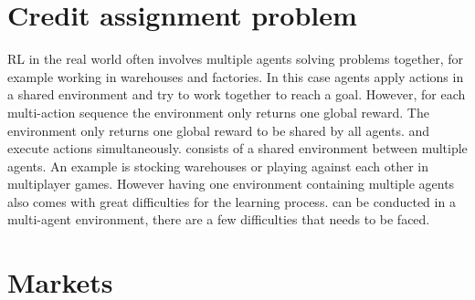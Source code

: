 \section{Credit assignment problem}

RL in the real world often involves multiple agents solving problems together, for
example working in warehouses and factories. In this case agents apply actions in a shared
environment and try to work together to reach a goal. However, for each multi-action sequence
the environment only returns one global reward.   The environment only returns one
global reward to be shared by all agents.
and execute actions
simultaneously.  consists of a shared environment between multiple agents. An example
is
stocking warehouses or playing against each other in multiplayer games. However
having one environment containing multiple agents also comes with great difficulties for
the learning process.     can be conducted in a multi-agent environment, there are a few difficulties
that needs to be faced.

\section{Markets}


